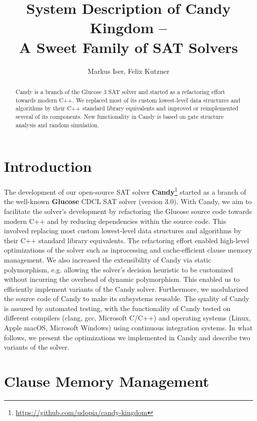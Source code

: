 \documentclass[conference]{IEEEtran}
\title{System Description of Candy Kingdom --\\ A Sweet Family of SAT Solvers}
\author{Markus Iser, Felix Kutzner}
\begin{document}
\maketitle

\begin{abstract}
Candy is a branch of the Glucose 3 SAT solver and started as a refactoring effort towards modern C++.
We replaced most of its custom lowest-level data structures and algorithms by their C++ standard library equivalents and improved or reimplemented several of its components.
New functionality in Candy is based on gate structure analysis and random simulation. 
\end{abstract}

\section{Introduction}

The development of our open-source SAT solver \textbf{Candy}\footnote{\url{https://github.com/udopia/candy-kingdom}} started as a branch of the well-known \textbf{Glucose} \cite{Audemard:2009:Glucose} CDCL SAT solver (version 3.0).
With Candy, we aim to facilitate the solver's development by refactoring the Glucose source code towards modern C++ and by reducing dependencies within the source code.
This involved replacing most custom lowest-level data structures and algorithms by their C++ standard library equivalents.
The refactoring effort enabled high-level optimizations of the solver such as inprocessing and cache-efficient clause memory management.
We also increased the extensibility of Candy via static polymorphism, e.g. allowing the solver's decision heuristic to be customized without incurring the overhead of dynamic polymorphism. This enabled us to efficiently implement variants of the Candy solver.
Furthermore, we modularized the source code of Candy to make its subsystems reusable.
The quality of Candy is assured by automated testing, with the functionality of Candy tested on different compilers (clang, gcc, Microsoft C/C++) and operating systems (Linux, Apple macOS, Microsoft Windows) using continuous integration systems.
In what follows, we present the optimizations we implemented in Candy and describe two variants of the solver.

\section{Clause Memory Management}
\label{sec:clauses}
\end{document}
